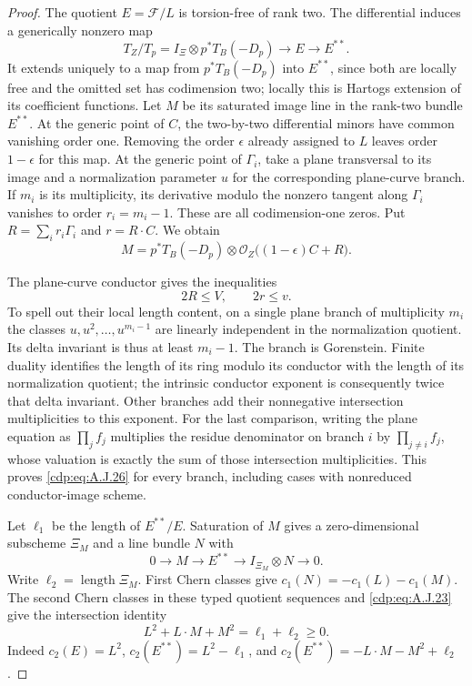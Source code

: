 \begin{proof}
The quotient $E=\mathcal F/L$ is torsion-free of rank
two. The differential induces a generically nonzero map
\[
 T_Z/T_p=I_\Xi\otimes p^*T_B(-D_p)
                    \longrightarrow E\longrightarrow E^{**}.
\]
It extends uniquely to a map from $p^*T_B(-D_p)$ into
$E^{**}$, since both are locally free and the omitted
set has codimension two; locally this is Hartogs
extension of its coefficient functions.
Let $M$ be its saturated image line in the rank-two
bundle $E^{**}$. At the generic point of $C$, the
two-by-two differential minors have common vanishing
order one. Removing the order $\epsilon$ already
assigned to $L$ leaves order $1-\epsilon$ for this map.
At the generic point of $\Gamma_i$, take a plane transversal
to its image and a normalization parameter $u$ for the
corresponding plane-curve branch. If $m_i$ is its
multiplicity, its derivative modulo the nonzero tangent
along $\Gamma_i$ vanishes to order $r_i=m_i-1$.
These are all codimension-one zeros. Put
$R=\sum_i r_i\Gamma_i$ and $r=R\cdot C$. We obtain
\[
 M=p^*T_B(-D_p)\otimes
           \mathcal O_Z\bigl((1-\epsilon)C+R\bigr).
                                                        \tag{A.J.25}\label{cdp:eq:A.J.25}
\]

The plane-curve conductor gives the inequalities
\[
 2R\leq V,\qquad 2r\leq v.                      \tag{A.J.26}\label{cdp:eq:A.J.26}
\]
To spell out their local length content, on a single
plane branch of multiplicity $m_i$ the classes
$u,u^2,\ldots,u^{m_i-1}$ are linearly independent in
the normalization quotient. Its delta invariant is thus
at least $m_i-1$. The branch is Gorenstein. Finite
duality identifies the length of its ring modulo its
conductor with the length of its normalization quotient;
the intrinsic conductor exponent is consequently twice
that delta invariant. Other branches add their
nonnegative intersection multiplicities to this exponent.
For the last comparison, writing the plane equation
as $\prod_j f_j$ multiplies the residue denominator on
branch $i$ by $\prod_{j\ne i}f_j$, whose valuation is
exactly the sum of those intersection multiplicities.
This proves \eqref{cdp:eq:A.J.26} for every branch, including cases
with nonreduced conductor-image scheme.

Let $\ell_1$ be the length of $E^{**}/E$. Saturation
of $M$ gives a zero-dimensional subscheme $\Xi_M$ and a
line bundle $N$ with
\[
 0\longrightarrow M\longrightarrow E^{**}
       \longrightarrow I_{\Xi_M}\otimes N\longrightarrow0.
\]
Write $\ell_2=\operatorname{length}\Xi_M$.
First Chern classes give $c_1(N)=-c_1(L)-c_1(M)$.
The second Chern classes in these typed quotient
sequences and \eqref{cdp:eq:A.J.23} give the intersection identity
\[
 L^2+L\cdot M+M^2=\ell_1+\ell_2\geq0.            \tag{A.J.27}\label{cdp:eq:A.J.27}
\]
Indeed $c_2(E)=L^2$,
$c_2(E^{**})=L^2-\ell_1$, and
$c_2(E^{**})=-L\cdot M-M^2+\ell_2$.


\end{proof}
